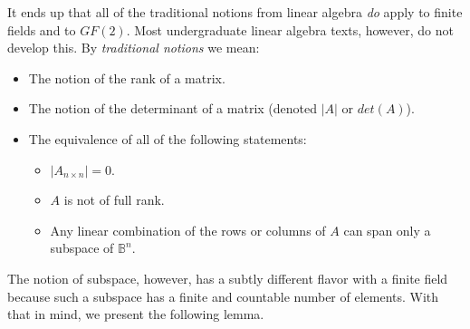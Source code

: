 It ends up that all of the traditional notions from linear algebra
\emph{do} apply to finite fields and to $GF(2)$.  Most undergraduate linear
algebra texts, however, do not develop this.  By 
\emph{traditional notions} we mean:

\begin{itemize}
\item The notion of the rank of a matrix.
\item The notion of the determinant of a matrix (denoted $|A|$ or $det(A)$).
\item The equivalence of all of the following statements:
      \begin{itemize}
      \item $|A_{n \times n}| = 0$.
      \item $A$ is not of full rank.
      \item Any linear combination of the rows or columns of $A$ can span
            only a subspace of $\mathbb{B}^n$.
      \end{itemize}
\end{itemize}

The notion of subspace, however, has a subtly different flavor with a finite
field because such a subspace has a finite and countable number of elements.
With that in mind, we present the following lemma.

